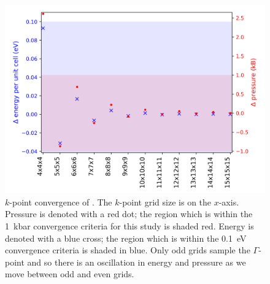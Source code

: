 \begin{figure}[h]
\centering
  \includegraphics[width=1.0\columnwidth]{figures/ch3/kpointconvergence.png}
  \caption[$k$-point convergence of ]{$k$-point convergence of . The $k$-point grid size is on the $x$-axis. Pressure is denoted with a red dot; the region which is within the \SI{1}{\kilo\bar} convergence criteria for this study is shaded red. Energy is denoted with a blue cross; the region which is within the \SI{0.1}{\electronvolt} convergence criteria  is shaded in blue. Only odd grids sample the $\Gamma$-point and so there is an oscillation in energy and pressure as we move between odd and even grids.}
  \label{kpointconvergence}
\end{figure}







